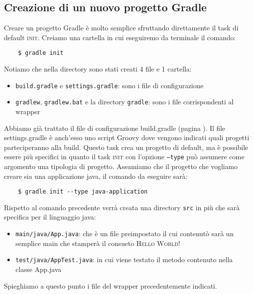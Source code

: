 \subsection{Creazione di un nuovo progetto Gradle}
Creare un progetto Gradle è molto semplice sfruttando direttamente il task di default \textsc{init}. Creiamo una cartella in cui eseguiremo da terminale il comando:
\begin{verbatim}
    $ gradle init\end{verbatim}
Notiamo che nella directory sono stati creati 4 file e 1 cartella:
\begin{itemize}
    \item \texttt{build.gradle} e \texttt{settings.gradle}: sono i file di configurazione
    \item \texttt{gradlew}, \texttt{gradlew.bat} e la directory \texttt{gradle}: sono i file corrispondenti al wrapper
\end{itemize}
Abbiamo già trattato il file di configurazione build.gradle (pagina \pageref{buildGradle}). Il file settings.gradle è anch'esso uno script Groovy dove vengono indicati quali progetti parteciperanno alla build. Questo task crea un progetto di default, ma è possibile essere più specifici in quanto il task \textsc{init} con l'opzione \texttt{--type} può assumere come argomento una tipologia di progetto. Assumiamo che il progetto che vogliamo creare sia una applicazione java, il comando da eseguire sarà:
\begin{verbatim}
    $ gradle init --type java-application\end{verbatim}
Rispetto al comando precedente verrà creata una directory \texttt{src} in più che sarà specifica per il linguaggio java:
\begin{itemize}
    \item \texttt{main/java/App.java}: che è un file preimpostato il cui contenutò sarà un semplice main che stamperà il consueto \textsc{Hello World!}
    \item \texttt{test/java/AppTest.java}: in cui viene testato il metodo contenuto nella classe App.java
\end{itemize}
Spieghiamo a questo punto i file del wrapper precedentemente indicati.
